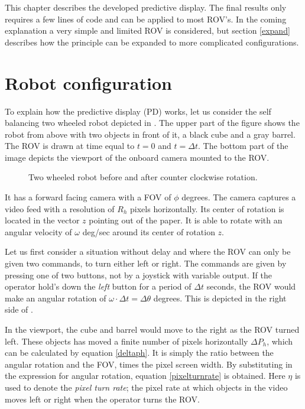 This chapter describes the developed predictive display. The final results only requires a few lines of code and can be applied to most ROV's. In the coming explanation a very simple and limited ROV is considered, but section \ref{expand} describes how the principle can be expanded to more complicated configurations.

\section{Robot configuration} \label{chp31}
 
To explain how the predictive display (PD) works, let us consider the self balancing two wheeled robot depicted in . The upper part of the figure shows the robot from above with two objects in front of it, a black cube and a gray barrel. The ROV is drawn at time equal to $t=0$ and $t=\Delta t$. The bottom part of the image depicts the viewport of the onboard camera mounted to the ROV.


\begin{figure}[h!]    
    \centering           
    \def\svgwidth{.75\columnwidth}
    
    \caption{Two wheeled robot before and after counter clockwise rotation.}
    \label{twoWheeled}
\end{figure}


It has a forward facing camera with a FOV of $\phi$ degrees. The camera captures a video feed with a resolution of $R_h$ pixels horizontally. Its center of rotation is located in the vector $z$ pointing out of the paper. It is able to rotate with an angular velocity of $\omega$ deg/sec around its center of rotation $z$.

Let us first consider a situation without delay and where the ROV can only be given two commands, to turn either left or right. The commands are given by pressing one of two buttons, not by a joystick with variable output. If the operator hold's down the \emph{left} button for a period of $\Delta t$ seconds, the ROV would make an angular rotation of $\omega \cdot \Delta t = \Delta \theta$ degrees. This is depicted in the right side of .

In the viewport, the cube and barrel would move to the right as the ROV turned left. These objects has moved a finite number of pixels horizontally $\Delta P_h$, which can be calculated by equation \ref{deltaph}. It is simply the ratio between the angular rotation and the FOV, times the pixel screen width. By substituting in the expression for angular rotation, equation \ref{pixelturnrate} is obtained. Here $\eta$ is used to denote the \textit{pixel turn rate}; the pixel rate at which objects in the video moves left or right when the operator turns the ROV.

